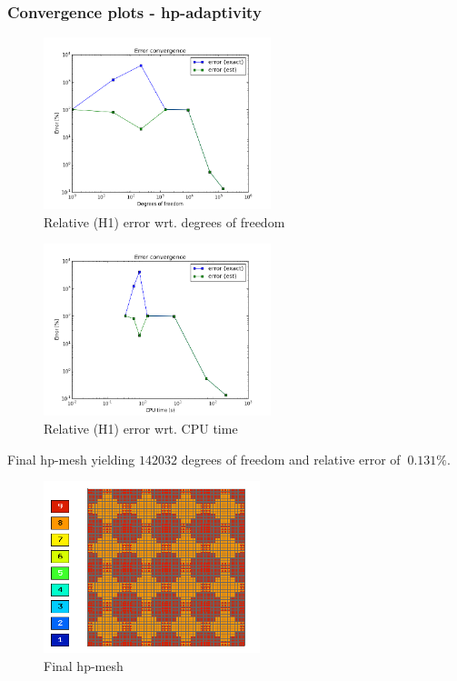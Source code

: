		\subsubsection{Convergence plots - hp-adaptivity}
			\begin{figure}[H]
				\centering
				\includegraphics[height=5cm]{img/sin100-hp-dof.png}
				\caption{Relative (H1) error wrt. degrees of freedom}
			\end{figure}
			
			\begin{figure}[H]
				\centering
				\includegraphics[height=5cm]{img/sin100-hp-cpu.png}
				\caption{Relative (H1) error wrt. CPU time}
			\end{figure}
			
			Final hp-mesh yielding $142032$ degrees of freedom and relative error of $~0.131\%$.
			\begin{figure}[H]
				\centering
				\includegraphics[height=5cm]{img/sin100-hp-finalmesh.png}
				\caption{Final hp-mesh}
			\end{figure}


